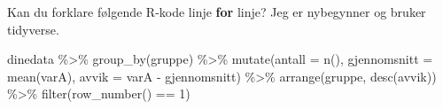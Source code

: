 \documentclass[
  norsk,
  letterpaper,
  DIV=11,
  numbers=noendperiod]{scrreprt}
\newenvironment{Shaded}{\begin{snugshade}}{\end{snugshade}}
\newcommand{\AttributeTok}[1]{\textcolor[rgb]{0.40,0.45,0.13}{#1}}
\newcommand{\ControlFlowTok}[1]{\textcolor[rgb]{0.00,0.23,0.31}{\textbf{#1}}}
\newcommand{\DecValTok}[1]{\textcolor[rgb]{0.68,0.00,0.00}{#1}}
\newcommand{\FunctionTok}[1]{\textcolor[rgb]{0.28,0.35,0.67}{#1}}
\newcommand{\NormalTok}[1]{\textcolor[rgb]{0.00,0.23,0.31}{#1}}
\newcommand{\SpecialCharTok}[1]{\textcolor[rgb]{0.37,0.37,0.37}{#1}}
\theoremstyle{definition}
\theoremstyle{remark}
\begin{document}
\begin{Shaded}
\begin{Highlighting}[]
\NormalTok{Kan du forklare følgende R}\SpecialCharTok{{-}}\NormalTok{kode linje }\ControlFlowTok{for}\NormalTok{ linje?}
\NormalTok{Jeg er nybegynner og bruker tidyverse.}

\NormalTok{  dinedata }\SpecialCharTok{\%\textgreater{}\%}
  \FunctionTok{group\_by}\NormalTok{(gruppe) }\SpecialCharTok{\%\textgreater{}\%}
  \FunctionTok{mutate}\NormalTok{(}\AttributeTok{antall =} \FunctionTok{n}\NormalTok{(), }\AttributeTok{gjennomsnitt =} \FunctionTok{mean}\NormalTok{(varA),}
         \AttributeTok{avvik =}\NormalTok{ varA }\SpecialCharTok{{-}}\NormalTok{ gjennomsnitt) }\SpecialCharTok{\%\textgreater{}\%}
  \FunctionTok{arrange}\NormalTok{(gruppe, }\FunctionTok{desc}\NormalTok{(avvik)) }\SpecialCharTok{\%\textgreater{}\%}
  \FunctionTok{filter}\NormalTok{(}\FunctionTok{row\_number}\NormalTok{() }\SpecialCharTok{==} \DecValTok{1}\NormalTok{)}
\end{Highlighting}
\end{Shaded}
\end{document}
